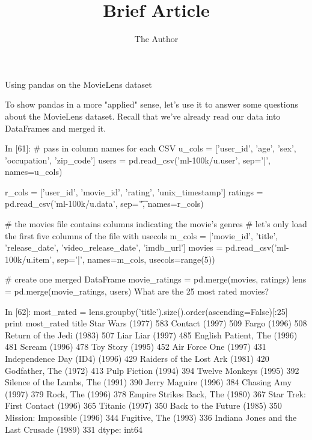 \documentclass[11pt]{article} %
\title{Brief Article}
\author{The Author}
\begin{document}

Using pandas on the MovieLens dataset

To show pandas in a more "applied" sense, let's use it to answer some questions about the MovieLens dataset. Recall that we've already read our data into DataFrames and merged it.

In [61]:
# pass in column names for each CSV
u_cols = ['user_id', 'age', 'sex', 'occupation', 'zip_code']
users = pd.read_csv('ml-100k/u.user', sep='|', names=u_cols)

r_cols = ['user_id', 'movie_id', 'rating', 'unix_timestamp']
ratings = pd.read_csv('ml-100k/u.data', sep='\t', names=r_cols)

# the movies file contains columns indicating the movie's genres
# let's only load the first five columns of the file with usecols
m_cols = ['movie_id', 'title', 'release_date', 'video_release_date', 'imdb_url']
movies = pd.read_csv('ml-100k/u.item', sep='|', names=m_cols, usecols=range(5))

# create one merged DataFrame
movie_ratings = pd.merge(movies, ratings)
lens = pd.merge(movie_ratings, users)
What are the 25 most rated movies?

In [62]:
most_rated = lens.groupby('title').size().order(ascending=False)[:25]
print most_rated
title
Star Wars (1977)                             583
Contact (1997)                               509
Fargo (1996)                                 508
Return of the Jedi (1983)                    507
Liar Liar (1997)                             485
English Patient, The (1996)                  481
Scream (1996)                                478
Toy Story (1995)                             452
Air Force One (1997)                         431
Independence Day (ID4) (1996)                429
Raiders of the Lost Ark (1981)               420
Godfather, The (1972)                        413
Pulp Fiction (1994)                          394
Twelve Monkeys (1995)                        392
Silence of the Lambs, The (1991)             390
Jerry Maguire (1996)                         384
Chasing Amy (1997)                           379
Rock, The (1996)                             378
Empire Strikes Back, The (1980)              367
Star Trek: First Contact (1996)              365
Titanic (1997)                               350
Back to the Future (1985)                    350
Mission: Impossible (1996)                   344
Fugitive, The (1993)                         336
Indiana Jones and the Last Crusade (1989)    331
dtype: int64
\end{document}
